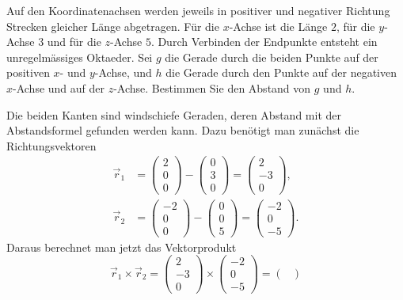 Auf den Koordinatenachsen werden jeweils in positiver und
negativer Richtung Strecken gleicher Länge abgetragen. Für die
$x$-Achse ist die Länge $2$, für die $y$-Achse $3$ und für die
$z$-Achse $5$. Durch Verbinden der Endpunkte entsteht ein
unregelmässiges Oktaeder. Sei $g$ die
Gerade durch die beiden Punkte auf der positiven $x$- und $y$-Achse,
und $h$ die Gerade durch den Punkte auf der negativen $x$-Achse
und auf der $z$-Achse. Bestimmen Sie den Abstand von $g$ und $h$.

\begin{loesung}
Die beiden Kanten sind windschiefe Geraden, deren Abstand mit
der Abstandsformel gefunden werden kann. Dazu benötigt man zunächst die
Richtungsvektoren
\begin{align*}
\vec r_1&=\begin{pmatrix}2\\0\\0\end{pmatrix}-\begin{pmatrix}0\\3\\0\end{pmatrix}
=
\begin{pmatrix}2\\-3\\0\end{pmatrix}
,\\
\vec r_2&=\begin{pmatrix}-2\\0\\0\end{pmatrix}-\begin{pmatrix}0\\0\\5\end{pmatrix}
=
\begin{pmatrix}-2\\0\\-5\end{pmatrix}
.
\end{align*}
Daraus berechnet man jetzt das Vektorprodukt
\[
\vec r_1\times \vec r_2
=
\begin{pmatrix}2\\-3\\0\end{pmatrix}
\times
\begin{pmatrix}-2\\0\\-5\end{pmatrix}
=
\begin{pmatrix}

\end{pmatrix}\]
\end{loesung}
